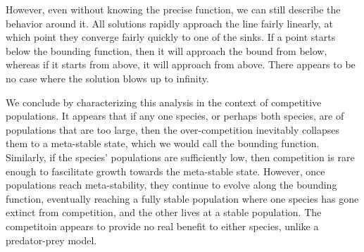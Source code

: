 \documentclass[11pt, letterpaper]{article}
\begin{document}
However, even without knowing the precise function, we can still describe the behavior around it. All solutions rapidly approach the line fairly linearly, at which point they converge fairly quickly to one of the sinks. If a point starts below the bounding function, then it will approach the bound from below, whereas if it starts from above, it will approach from above. There appears to be no case where the solution blows up to infinity.

We conclude by characterizing this analysis in the context of competitive populations. It appears that if any one species, or perhaps both species, are of populations that are too large, then the over-competition inevitably collapses them to a meta-stable state, which we would call the bounding function. Similarly, if the species' populations are sufficiently low, then competition is rare enough to fascilitate growth towards the meta-stable state. However, once populations reach meta-stability, they continue to evolve along the bounding function, eventually reaching a fully stable population where one species has gone extinct from competition, and the other lives at a stable population. The competitoin appears to provide no real benefit to either species, unlike a predator-prey model.


\appendix
\end{document}
